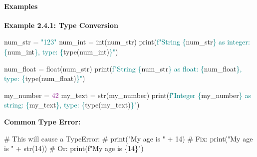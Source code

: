 \documentclass[
  justified,
  openright,
]{tufte-book}
\let\subsubsection\paragraph
\let\paragraph\paragraph
\newcommand{\BuiltInTok}[1]{#1}
\newcommand{\CommentTok}[1]{\textcolor{MidGray}{#1}}
\newcommand{\DecValTok}[1]{\textcolor{Purple}{#1}}
\newcommand{\NormalTok}[1]{#1}
\newcommand{\OperatorTok}[1]{\textcolor{DarkGray}{#1}}
\newcommand{\SpecialCharTok}[1]{\textcolor{Teal}{#1}}
\newcommand{\SpecialStringTok}[1]{\textcolor{Teal}{#1}}
\newcommand{\StringTok}[1]{\textcolor{Teal}{#1}}
\newenvironment{Shaded}{%
  \begin{snugshade}
}{%
  \end{snugshade}
}
\let\subsubsection\paragraph
\let\paragraph\paragraph
\begin{document}
\subsubsection{Examples}\label{examples-4}

\textbf{Example 2.4.1: Type Conversion}

\begin{Shaded}
\begin{Highlighting}[]
\NormalTok{num\_str }\OperatorTok{=} \StringTok{"123"}
\NormalTok{num\_int }\OperatorTok{=} \BuiltInTok{int}\NormalTok{(num\_str)}
\BuiltInTok{print}\NormalTok{(}\SpecialStringTok{f"String \textquotesingle{}}\SpecialCharTok{\{}\NormalTok{num\_str}\SpecialCharTok{\}}\SpecialStringTok{\textquotesingle{} as integer: }\SpecialCharTok{\{}\NormalTok{num\_int}\SpecialCharTok{\}}\SpecialStringTok{, type: }\SpecialCharTok{\{}\BuiltInTok{type}\NormalTok{(num\_int)}\SpecialCharTok{\}}\SpecialStringTok{"}\NormalTok{)}

\NormalTok{num\_float }\OperatorTok{=} \BuiltInTok{float}\NormalTok{(num\_str)}
\BuiltInTok{print}\NormalTok{(}\SpecialStringTok{f"String \textquotesingle{}}\SpecialCharTok{\{}\NormalTok{num\_str}\SpecialCharTok{\}}\SpecialStringTok{\textquotesingle{} as float: }\SpecialCharTok{\{}\NormalTok{num\_float}\SpecialCharTok{\}}\SpecialStringTok{, type: }\SpecialCharTok{\{}\BuiltInTok{type}\NormalTok{(num\_float)}\SpecialCharTok{\}}\SpecialStringTok{"}\NormalTok{)}

\NormalTok{my\_number }\OperatorTok{=} \DecValTok{42}
\NormalTok{my\_text }\OperatorTok{=} \BuiltInTok{str}\NormalTok{(my\_number)}
\BuiltInTok{print}\NormalTok{(}\SpecialStringTok{f"Integer }\SpecialCharTok{\{}\NormalTok{my\_number}\SpecialCharTok{\}}\SpecialStringTok{ as string: \textquotesingle{}}\SpecialCharTok{\{}\NormalTok{my\_text}\SpecialCharTok{\}}\SpecialStringTok{\textquotesingle{}, type: }\SpecialCharTok{\{}\BuiltInTok{type}\NormalTok{(my\_text)}\SpecialCharTok{\}}\SpecialStringTok{"}\NormalTok{)}
\end{Highlighting}
\end{Shaded}

\textbf{Common Type Error:}

\begin{Shaded}
\begin{Highlighting}[]
\CommentTok{\# This will cause a TypeError:}
\CommentTok{\# print("My age is " + 14)}
\CommentTok{\# Fix: print("My age is " + str(14))}
\CommentTok{\# Or: print(f"My age is \{14\}")}
\end{Highlighting}
\end{Shaded}
\end{document}
